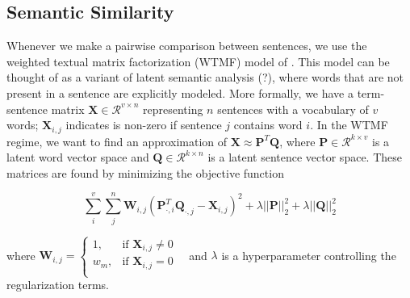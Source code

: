 








\subsection{Semantic Similarity}\label{subsec:semsim}

Whenever we make a pairwise comparison between sentences, we use the weighted
textual matrix factorization (WTMF) model of \cite{guo2012simple}. This 
model can be thought of as a variant of latent semantic analysis (?), 
where words that are not present in a sentence are explicitly modeled.
More formally, we have a term-sentence matrix 
$\mathbf{X}\in\mathcal{R}^{v \times n}$ representing $n$ sentences with a 
vocabulary of $v$ words; $\mathbf{X}_{i,j}$ indicates is non-zero if sentence
$j$ contains word $i$. In the WTMF regime, we want to find an approximation
of $\mathbf{X} \approx \mathbf{P}^T\mathbf{Q}$, where 
$\mathbf{P} \in \mathcal{R}^{k \times v}$ is a latent word vector space and
$\mathbf{Q} \in \mathcal{R}^{k \times n}$ is a latent sentence vector
space. These matrices are found by minimizing the objective function

$$\sum_i^v \sum_j^n \mathbf{W}_{i,j}(\mathbf{P}_{\cdot,i}^T
\mathbf{Q}_{\cdot,j} 
- \mathbf{X}_{i,j})^2 
 + \lambda ||\mathbf{P}||_2^2 + \lambda ||\mathbf{Q}||_2^2$$

where $\mathbf{W}_{i,j} = 
\begin{cases} 1, & \textrm{if $\mathbf{X}_{i,j} \ne 0$ } \\
w_m, & \textrm{if $\mathbf{X}_{i,j} = 0$ }\\
\end{cases}$
and $\lambda$ is a hyperparameter controlling the regularization terms.

